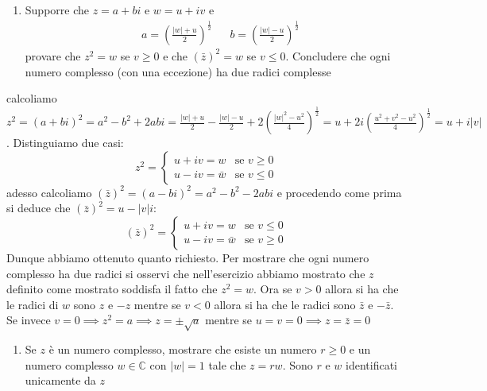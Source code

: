 \documentclass{report}
\begin{document}
\begin{enumerate}[resume, label=\protect\circled{\arabic*}]
	\item Supporre che $z=a+bi$ e $w=u+iv$ e
	\begin{align*}
		&a = \left( \frac{|w|+u}{2} \right)^{\frac{1}{2}} & &b=\left(\frac{|w|-u}{2} \right)^{\frac{1}{2}}
	\end{align*}
	provare che $z^2=w$ se $v \geq 0$ e che $(\bar{z})^2 = w$ se $v \leq 0$. Concludere che ogni numero complesso (con una eccezione) ha due radici complesse
\end{enumerate}
\begin{mysolution}
	calcoliamo $z^2 = (a + bi)^2 = a^2 - b^2 + 2abi = \frac{|w| + u}{2} - \frac{|w|-u}{2} + 2 \left( \frac{|w|^2 - u^2}{4} \right)^{\frac{1}{2}} = u + 2i \left( \frac{u^2 + v^2 - u^2}{4} \right)^{\frac{1}{2}} = u + i|v|$. Distinguiamo due casi:
	\begin{equation*}
		z^2 = \begin{cases}
			u+iv=w  & \text{se } v \geq 0 \\
			u-iv=\bar{w}   & \text{se } v \leq 0
		\end{cases}
	\end{equation*}
	adesso calcoliamo $(\bar{z})^2 = (a-bi)^2 = a^2 - b^2 - 2abi$ e procedendo come prima si deduce che $(\bar{z})^2 = u-|v|i$:
	\begin{equation*}
		(\bar{z})^2 = \begin{cases}
			u+iv = w & \text{se } v \leq 0 \\
			u-iv = \bar{w} & \text{se } v \geq 0
		\end{cases}
	\end{equation*}
Dunque abbiamo ottenuto quanto richiesto. Per mostrare che ogni numero complesso ha due radici si osservi che nell'esercizio abbiamo mostrato che $z$ definito come mostrato soddisfa il fatto che $z^2 = w$. Ora se $v>0$ allora si ha che le radici di $w$ sono $z$ e $-z$ mentre se $v<0$ allora si ha che le radici sono $\bar{z}$ e $-\bar{z}$. Se invece $v=0 \implies z^2 = a \implies z = \pm \sqrt{a}$ mentre se $u=v=0 \implies z=\bar{z}=0$
\end{mysolution}
\begin{enumerate}[resume, label=\protect\circled{\arabic*}]
	\item Se $z$ è un numero complesso, mostrare che esiste un numero $r \geq 0$ e un numero complesso $w \in \mathbb{C}$ con $|w|=1$ tale che $z=rw$. Sono $r$ e $w$ identificati unicamente da $z$
\end{enumerate}
\end{document}
